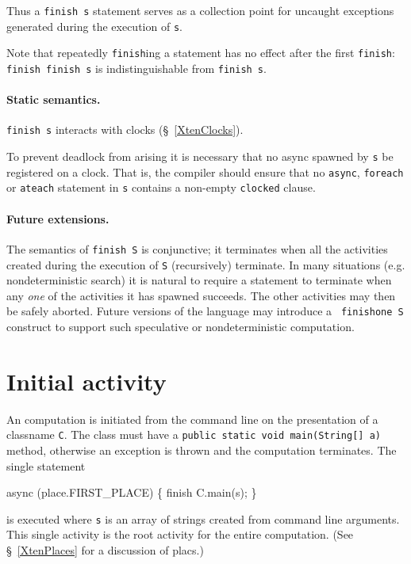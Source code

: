 Thus a {\tt finish s} statement serves as a collection point for
uncaught exceptions generated during the execution of {\tt s}.

Note that repeatedly {\tt finish}ing a statement has no effect after
the first {\tt finish}: {\tt finish finish s} is indistinguishable
from {\tt finish s}.

\cbstart 
\paragraph{Static semantics.} 
{\tt finish s} interacts with clocks (\S~\ref{XtenClocks}). 

To prevent deadlock from arising it is necessary that no async spawned
by {\tt s} be registered on a clock. That is, the compiler should
ensure that no {\tt async}, {\tt foreach} or {\tt ateach} statement in
{\tt s} contains a non-empty {\tt clocked} clause.

\cbend
\paragraph{Future extensions.} 

The semantics of {\tt finish S} is conjunctive; it terminates when all
the activities created during the execution of {\tt S} (recursively)
terminate. In many situations (e.g.{} nondeterministic search) it is
natural to require a statement to terminate when any {\em one} of the
activities it has spawned succeeds. The other activities may then be
safely aborted. Future versions of the language may introduce a {\tt
finishone S} construct to support such speculative or nondeterministic
computation.


\section{Initial activity}\label{initial-computation}

An \Xten{} computation is initiated from the command line on the
presentation of a classname {\tt C}. The class must have a {\tt public
static void main(String[] a)} method, otherwise an exception is thrown
and the computation terminates.  The single statement
\begin{x10}
async (place.FIRST\_PLACE) \{ 
  finish C.main(s);
\}
\end{x10} 
\noindent is executed where {\tt s} is an array of strings created
from command line arguments. This single activity is the root activity
for the entire computation. (See \S~\ref{XtenPlaces} for a discussion of
placs.)

